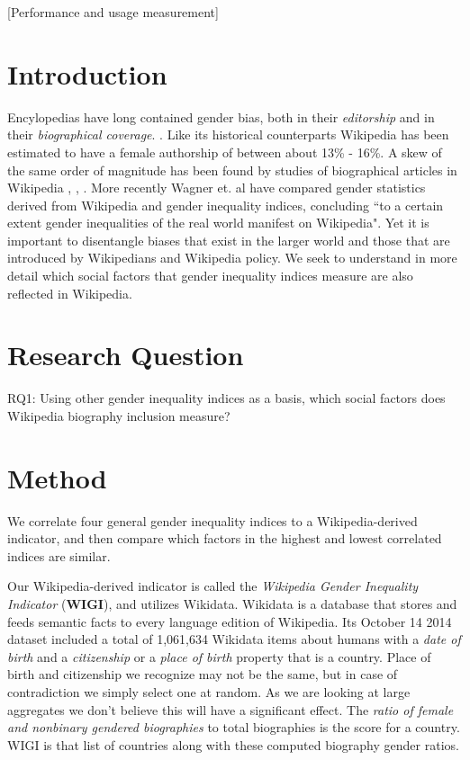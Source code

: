 \documentclass{sig-alternate}
\begin{document}
[Performance and usage measurement]



\section{Introduction}
Encylopedias have long contained gender bias, both in their \textit{editorship} and in their \textit{biographical coverage}. \cite{thomas:respect} \cite{reagle}. Like its historical counterparts Wikipedia has been estimated to have a female authorship of between about 13\% - 16\%\cite{hill}. A skew of the same order of magnitude has been found by studies of biographical articles in Wikipedia \cite{lam}, \cite{eom}, \cite{reagle}.  More recently Wagner et. al have compared gender statistics derived from Wikipedia and gender inequality indices, concluding ``to a certain extent gender inequalities of the real world manifest on Wikipedia"\cite{DBLP:journals/corr/WagnerGJS15}.  Yet it is important to disentangle biases that exist in the larger world and those that are introduced by Wikipedians and Wikipedia policy. We seek to understand in more detail which social factors that gender inequality indices measure are also reflected in Wikipedia.


\section{Research Question}
RQ1: Using other gender inequality indices as a basis, which social factors does Wikipedia biography inclusion measure?


\section{Method}
We correlate four general gender inequality indices to a Wikipedia-derived indicator, and then compare which factors in the highest and lowest correlated indices are similar.

Our Wikipedia-derived indicator is called the \textit{Wikipedia Gender Inequality Indicator} (\textbf{WIGI}), and utilizes Wikidata. Wikidata is a database that stores and feeds semantic facts to every language edition of Wikipedia. Its October 14 2014 dataset included a total of 1,061,634 Wikidata items about humans with a \textit{date of birth} and a \textit{citizenship} or a \textit{place of birth} property that is a country. Place of birth and citizenship we recognize may not be the same, but in case of contradiction we simply select one at random. As we are looking at large aggregates we don't believe this will have a significant effect. The \textit{ratio of female and nonbinary gendered biographies} to total biographies is the score for a country\cite{klein:wigi}. WIGI is that list of countries along with these computed biography gender ratios.
\end{document}
